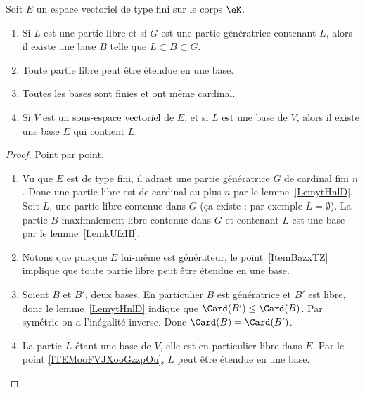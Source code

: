 \begin{theorem} \label{ThonmnWKs}
    Soit \( E\) un espace vectoriel de type fini sur le corps \( \eK\).
    \begin{enumerate}
        \item     \label{ItemBazxTZ}
            Si \( L\) est une partie libre et si \( G\) est une partie génératrice contenant \( L\), alors il existe une base \( B\) telle que \( L\subset B\subset G\).
        \item     \label{ITEMooFVJXooGzzpOu}
            Toute partie libre peut être étendue en une base.
        \item     \label{ITEMooFBUAooSSZxgx}
            Toutes les bases sont finies et ont même cardinal.
        \item       \label{ITEMooJIJSooGuJMdt}
            Si \( V\) est un sous-espace vectoriel de \( E\), et si \( L\) est une base de \( V\), alors il existe une base \( E\) qui contient \( L\).
    \end{enumerate}
\end{theorem}

\begin{proof}
    Point par point.
    \begin{enumerate}
        \item
    Vu que \( E\) est de type fini, il admet une partie génératrice \( G\) de cardinal fini \( n\). Donc une partie libre est de cardinal au plus \( n\) par le lemme~\ref{LemytHnlD}. Soit \( L\), une partie libre contenue dans \( G\) (ça existe : par exemple \( L=\emptyset\)). La partie \( B\) maximalement libre contenue dans \( G\) et contenant \( L\) est une base par le lemme~\ref{LemkUfzHl}.
\item
Notons que puisque \( E\) lui-même est générateur, le point~\ref{ItemBazxTZ} implique que toute partie libre peut être étendue en une base.
\item
    Soient \( B\) et \( B'\), deux bases. En particulier \( B\) est génératrice et \( B'\) est libre, donc le lemme~\ref{LemytHnlD} indique que \( \Card(B')\leq \Card(B)\). Par symétrie on a l'inégalité inverse. Donc \( \Card(B)=\Card(B')\).
\item
    La partie \( L\) étant une base de \( V\), elle est en particulier libre dans \( E\). Par le point \ref{ITEMooFVJXooGzzpOu}, \( L\) peut être étendue en une base.
    \end{enumerate}
\end{proof}

